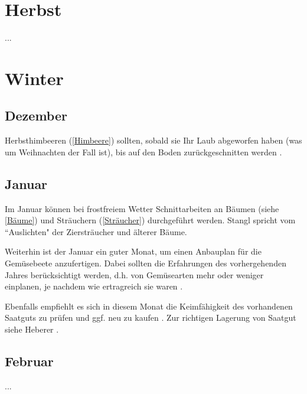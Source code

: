 \section{Herbst}

...

\pagebreak

\section{Winter}

\subsection{Dezember}

Herbsthimbeeren (\ref{Himbeere}) sollten, sobald sie Ihr Laub abgeworfen haben (was um Weihnachten der Fall ist), bis auf den Boden zurückgeschnitten werden \cite[S.~421]{Don2021}.

\subsection{Januar}

Im Januar können bei frostfreiem Wetter Schnittarbeiten an \textrightarrow Bäumen (siehe \ref{Bäume}) und \textrightarrow Sträuchern (\ref{Sträucher}) durchgeführt werden.
Stangl \cite[S.~256]{Stangl1995} spricht vom ``Auslichten" der Ziersträucher und älterer Bäume.

Weiterhin ist der Januar ein guter Monat, um einen Anbauplan für die Gemüsebeete anzufertigen.
Dabei sollten die Erfahrungen des vorhergehenden Jahres berücksichtigt werden, d.h. von Gemüsearten mehr oder weniger einplanen, je nachdem wie ertragreich sie waren \cite[S.~256]{Stangl1995}.

Ebenfalls empfiehlt es sich in diesem Monat die Keimfähigkeit des vorhandenen Saatguts zu prüfen und ggf. neu zu kaufen \cite[S.~216]{Heberer2018}.
Zur richtigen Lagerung von Saatgut siehe Heberer \cite[S.~179]{Heberer2018}.

\subsection{Februar}

...
